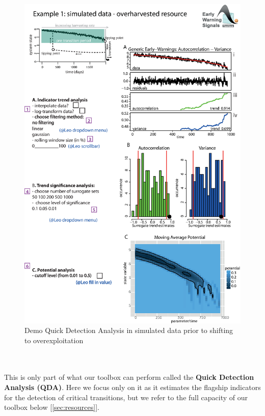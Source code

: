 \documentclass[12pt,a4paper,final]{article}
\begin{document}
\begin{figure}[ht]
\begin{center}
\includegraphics[scale=0.8]{fig_2_simulated_970pts.eps}
\caption{Demo Quick Detection Analysis in simulated data prior to shifting to overexploitation}
\end{center}
\label{fig:simulatedQDA}
\end{figure}
\\
\\
This is only part of what our toolbox can perform called the \textbf{Quick Detection Analysis (QDA)}. Here we focus only on it as it estimates the flagship indicators for the detection of critical transitions, but we refer to the full capacity of our toolbox below [\ref{sec:resources}].
\\
\\ 
\end{document}
